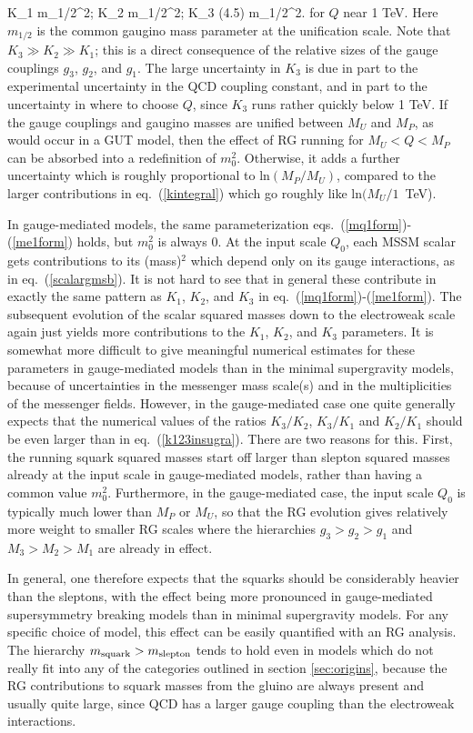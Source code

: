 \beq
K_1  m_{1/2}^2;\qquad
K_2  m_{1/2}^2;\qquad
K_3 \approx (4.5) m_{1/2}^2.
\label{k123insugra}
\eeq
for $Q$ near 1 TeV. Here $m_{1/2}$ is the common gaugino mass parameter
at the unification scale. Note that
$K_3 \gg K_2 \gg K_1$; this is a direct consequence
of the relative sizes of the gauge couplings $g_3$, $g_2$, and $g_1$.
The large uncertainty in $K_3$ is due in part to the
experimental uncertainty in the
QCD coupling constant, and in part to the uncertainty in where to
choose $Q$, since $K_3$ runs rather quickly below 1 TeV.
If the gauge couplings and gaugino masses are unified between $M_U$ and
$M_P$, as would occur in a GUT model,
then the effect of RG running for $M_U < Q < M_P$ can be absorbed into
a redefinition of $m_0^2$. Otherwise, it adds a further uncertainty
which is roughly proportional to ln$(M_P/M_U)$, compared to the
larger contributions in eq.~(\ref{kintegral}) which go roughly
like ln$(M_U/1$~TeV).

In gauge-mediated models, the same parameterization
 eqs.~(\ref{mq1form})-(\ref{me1form}) holds, but
$m_0^2$ is always 0. At the input scale $Q_0$,
each MSSM scalar gets contributions to its (mass)$^2$
 which depend only
on its
gauge interactions, as in eq.~(\ref{scalargmsb}).
It is not hard to see that in general
these contribute in exactly the same pattern as $K_1$, $K_2$, and $K_3$
in eq.~(\ref{mq1form})-(\ref{me1form}). The subsequent evolution
of the scalar squared masses down to the electroweak scale
again just yields more contributions
to the $K_1$, $K_2$, and $K_3$ parameters. It is somewhat more difficult
to give meaningful numerical estimates for these parameters in
gauge-mediated models than in the minimal supergravity models,
because of uncertainties in the messenger mass scale(s)
and in the multiplicities of the messenger fields.
However, in the gauge-mediated case one quite generally expects
that the numerical values of the
ratios $K_3/K_2$, $K_3/K_1$ and $K_2/K_1$ should be
even larger than in eq.~(\ref{k123insugra}).
There are two reasons for this.
First, the running squark squared masses start off larger
than slepton squared masses
already at the input
scale in gauge-mediated models, rather than having a common value $m_0^2$.
Furthermore, in the gauge-mediated
case, the input scale $Q_0$
is typically much lower than
$M_P$ or $M_U$, so that the RG evolution gives relatively more weight
to smaller RG scales where the hierarchies
$g_3>g_2>g_1$ and $M_3>M_2>M_1$ are already in effect.

In general, one therefore expects that the squarks should be
considerably heavier than the sleptons, with the effect being more
pronounced in gauge-mediated supersymmetry breaking models
than in minimal supergravity models.
For any specific
choice of model, this effect can be easily quantified with an RG analysis.
The hierarchy $m_{\rm squark} > m_{\rm slepton}$ tends to hold even
in models which do not really fit into any of the categories outlined in
section \ref{sec:origins}, because the RG contributions to squark
masses from the gluino
are always present and usually quite large, since QCD has a larger gauge
coupling than the electroweak interactions.

